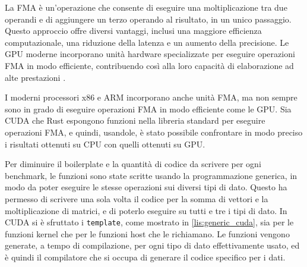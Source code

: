 La FMA è un'operazione che consente di eseguire una moltiplicazione tra due operandi e di aggiungere un terzo operando al risultato, in un unico passaggio. Questo approccio offre diversi vantaggi, inclusi una maggiore efficienza computazionale, una riduzione della latenza e un aumento della precisione. Le GPU moderne incorporano unità hardware specializzate per eseguire operazioni FMA in modo efficiente, contribuendo così alla loro capacità di elaborazione ad alte prestazioni \cite[]{NVIDIA:fma}.

I moderni processori x86 e ARM incorporano anche unità FMA, ma non sempre sono in grado di eseguire operazioni FMA in modo efficiente come le GPU. Sia CUDA che Rust espongono funzioni nella libreria standard per eseguire operazioni FMA, e quindi, usandole, è stato possibile confrontare in modo preciso i risultati ottenuti su CPU con quelli ottenuti su GPU.


Per diminuire il boilerplate e la quantità di codice da scrivere per ogni benchmark, le funzioni sono state scritte usando la programmazione generica, in modo da poter eseguire le stesse operazioni sui diversi tipi di dato. Questo ha permesso di scrivere una sola volta il codice per la somma di vettori e la moltiplicazione di matrici, e di poterlo eseguire su tutti e tre i tipi di dato. In CUDA si è sfruttato i \verb|template|, come mostrato in \ref{lis:generic_cuda}, sia per le funzioni kernel che per le funzioni host che le richiamano. Le funzioni vengono generate, a tempo di compilazione, per ogni tipo di dato effettivamente usato, ed è quindi il compilatore che si occupa di generare il codice specifico per i dati. 

